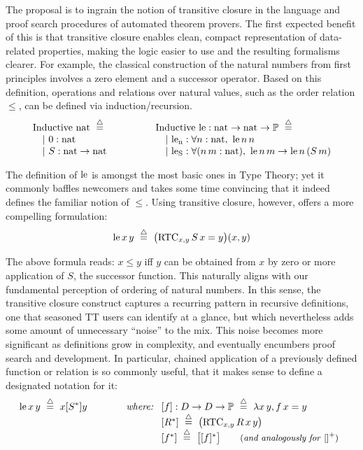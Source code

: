 The proposal is to ingrain the notion of transitive closure in the language and proof search procedures of automated theorem provers.
The first expected benefit of this is that transitive closure enables clean, compact representation of data-related properties,
making the logic easier to use and the resulting formalisms clearer.
For example, the classical construction of the natural numbers from first principles involves a zero element and a successor operator.
Based on this definition, operations and relations over natural values, such as the order relation $\leq$, can be defined via induction/recursion.
\[
\begin{array}{l@{\hspace{4em}}l}
\begin{array}[t]{l}
\rInductive~\tnat~\eqdef \\
\quad |~0 : \tnat \\
\quad |~S : \tnat \to\tnat
\end{array}
&
\begin{array}[t]{l}
\rInductive~\fle : \tnat \to \tnat \to \tProp ~\eqdef \\
\quad |~\fctorlen : \forall n:\tnat,~ \fle\,n\,n\\
\quad |~\fctorleS : \forall (n\,m:\tnat),~ \fle\,n\,m\to\fle\,n\,(S\,m)
\end{array}
\end{array}
\]

The definition of $\mathrm{le}$ is amongst the most basic ones in Type Theory; yet it commonly baffles newcomers and takes some time convincing that it indeed defines the familiar notion of $\leq$.
Using transitive closure, however, offers a more compelling formulation:
\[
\mathrm{le}\,x\,y ~\overset{\triangle}{=}~ \big(\mathrm{RTC}_{x,y}\,S\,x=y\big)(x,y)
\]

The above formula reads: $x\leq y$ iff $y$ can be obtained from $x$ by zero or more application of $S$, the successor function.
This naturally aligns with our fundamental perception of ordering of natural numbers.
In this sense, the transitive closure construct captures a recurring pattern in recursive definitions, one that seasoned TT users can identify at a glance, but which nevertheless adds some amount of unnecessary ``noise'' to the mix.
This noise becomes more significant as definitions grow in complexity, and eventually encumbers proof search and development.
In particular, chained application of a previously defined function or relation is so commonly useful, that it makes sense to define a designated notation for it:
\[
\mathrm{le}\,x\,y ~\overset{\triangle}{=}~ x[S^*]y \hspace{4em}
\textit{where:}~
\begin{array}[t]{l}
  {} [f] : D\to D\to\mathbb{P} ~\overset{\triangle}{=}~ \lambda x\,y, f\,x=y \\
  {} [R^*] ~\overset{\triangle}{=}~ \big(\mathrm{RTC}_{x,y}\,R\,x\,y\big) \\
  {} [f^*] ~\overset{\triangle}{=}~ \big[[f]^*\big]  \qquad\textrm{\small(\textit{and analogously for} ${[]}^+$)}
\end{array}
\]

